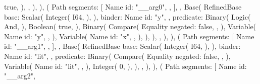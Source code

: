 \documentclass[
  oneside,
  english,
  coorientadorbanca,
  noabntexcite
]{ufsc-thesis-rn46-2019}
\begin{document}
\begin{rustcode}
{{                        true,
                    ),
                },
            ),
        ),
        (
            Path {
                segments: [
                    Name {
                        id: "__arg0",
                    },
                ],
            },
            Base(
                RefinedBase {
                    base: Scalar(
                        Integer(
                            I64,
                        ),
                    ),
                    binder: Name {
                        id: "y",
                    },
                    predicate: Binary(
                        Logic(
                            And,
                        ),
                        Boolean(
                            true,
                        ),
                        Binary(
                            Compare(
                                Equality {
                                    negated: false,
                                },
                            ),
                            Variable(
                                Name {
                                    id: "y",
                                },
                            ),
                            Variable(
                                Name {
                                    id: "x",
                                },
                            ),
                        ),
                    ),
                },
            ),
        ),
        (
            Path {
                segments: [
                    Name {
                        id: "__arg1",
                    },
                ],
            },
            Base(
                RefinedBase {
                    base: Scalar(
                        Integer(
                            I64,
                        ),
                    ),
                    binder: Name {
                        id: "lit",
                    },
                    predicate: Binary(
                        Compare(
                            Equality {
                                negated: false,
                            },
                        ),
                        Variable(
                            Name {
                                id: "lit",
                            },
                        ),
                        Integer(
                            0,
                        ),
                    ),
                },
            ),
        ),
        (
            Path {
                segments: [
                    Name {
                        id: "__arg2",
}}}
\end{rustcode}
\end{document}
